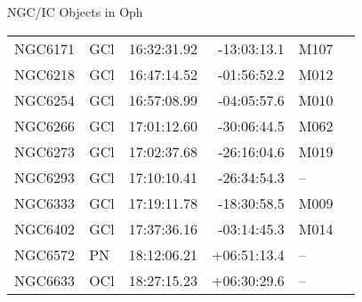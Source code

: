 \begin{block}{NGC/IC Objects in Oph}
  \centering
  \begin{tabularx}{\textwidth}{llrrll} 
    NGC6171 & GCl & 16:32:31.92 & -13:03:13.1  & M107 \\ 
    NGC6218 & GCl & 16:47:14.52 & -01:56:52.2  & M012 \\ 
    NGC6254 & GCl & 16:57:08.99 & -04:05:57.6  & M010 \\ 
    NGC6266 & GCl & 17:01:12.60 & -30:06:44.5  & M062 \\ 
    NGC6273 & GCl & 17:02:37.68 & -26:16:04.6  & M019 \\ 
    NGC6293 & GCl & 17:10:10.41 & -26:34:54.3  & -- \\ 
    NGC6333 & GCl & 17:19:11.78 & -18:30:58.5  & M009 \\ 
    NGC6402 & GCl & 17:37:36.16 & -03:14:45.3  & M014 \\ 
    NGC6572 & PN & 18:12:06.21 & +06:51:13.4  & -- \\ 
    NGC6633 & OCl & 18:27:15.23 & +06:30:29.6  & -- \\ 
  \end{tabularx}
\end{block}